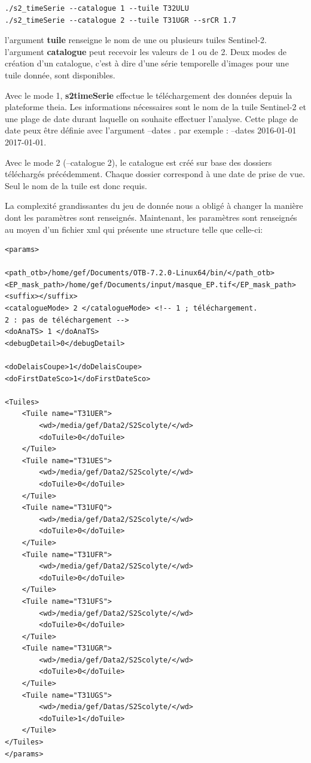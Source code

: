 \documentclass[a4paper, 12pt]{article} %
\begin{document}
\begin{lstlisting}
./s2_timeSerie --catalogue 1 --tuile T32ULU 
./s2_timeSerie --catalogue 2 --tuile T31UGR --srCR 1.7
\end{lstlisting}

l'argument \textbf{tuile} renseigne le nom de une ou plusieurs tuiles Sentinel-2.
l'argument \textbf{catalogue} peut recevoir les valeurs de 1 ou de 2. Deux modes de création d'un catalogue, c'est à dire d'une série temporelle d'images pour une tuile donnée, sont disponibles.

Avec le mode 1, \textbf{s2{\textunderscore}timeSerie} effectue le téléchargement des données depuis la plateforme theia. Les informations nécessaires sont le nom de la tuile Sentinel-2 et une plage de date durant laquelle on souhaite effectuer l'analyse. Cette plage de date peux être définie avec l'argument --dates . par exemple : --dates 2016-01-01 2017-01-01.

Avec le mode 2 (--catalogue 2), le catalogue est créé sur base des dossiers téléchargés précédemment. Chaque dossier correspond à une date de prise de vue. Seul le nom de la tuile est donc requis.

La complexité grandissantes du jeu de donnée nous a obligé à changer la manière dont les paramètres sont renseignés. 
Maintenant, les paramètres sont renseignés au moyen d'un fichier xml qui présente une structure telle que celle-ci:
\lstset{language=XML}
\begin{lstlisting}
<params>

<path_otb>/home/gef/Documents/OTB-7.2.0-Linux64/bin/</path_otb>
<EP_mask_path>/home/gef/Documents/input/masque_EP.tif</EP_mask_path>
<suffix></suffix>
<catalogueMode> 2 </catalogueMode> <!-- 1 ; téléchargement. 
2 : pas de téléchargement -->
<doAnaTS> 1 </doAnaTS>
<debugDetail>0</debugDetail>

<doDelaisCoupe>1</doDelaisCoupe>
<doFirstDateSco>1</doFirstDateSco>

<Tuiles>
	<Tuile name="T31UER">
		<wd>/media/gef/Data2/S2Scolyte/</wd>
		<doTuile>0</doTuile>
	</Tuile>
	<Tuile name="T31UES">
		<wd>/media/gef/Data2/S2Scolyte/</wd>
		<doTuile>0</doTuile>
	</Tuile>
	<Tuile name="T31UFQ">
		<wd>/media/gef/Data2/S2Scolyte/</wd>
		<doTuile>0</doTuile>
	</Tuile>
	<Tuile name="T31UFR">
		<wd>/media/gef/Data2/S2Scolyte/</wd>
		<doTuile>0</doTuile>
	</Tuile>
	<Tuile name="T31UFS">
		<wd>/media/gef/Data2/S2Scolyte/</wd>
		<doTuile>0</doTuile>
	</Tuile>
	<Tuile name="T31UGR">
		<wd>/media/gef/Data2/S2Scolyte/</wd>
		<doTuile>0</doTuile>
	</Tuile>
	<Tuile name="T31UGS">
		<wd>/media/gef/Datas/S2Scolyte/</wd>
		<doTuile>1</doTuile>
	</Tuile>
</Tuiles>
</params>
\end{lstlisting}
\end{document}

